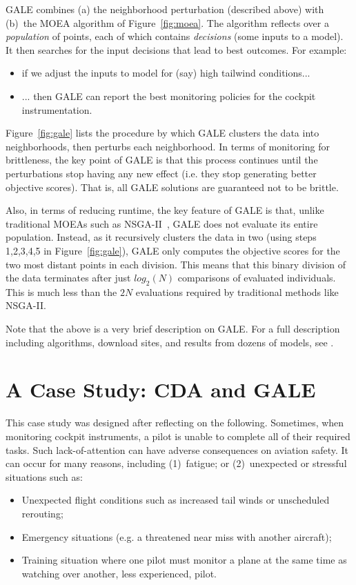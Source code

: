 \documentclass[journal]{IEEEtran}
\newcommand{\bi}{\begin{itemize}}
\newcommand{\ei}{\end{itemize}}
\newcommand{\fig}[1]{Figure~\ref{fig:#1}}
\begin{document}
GALE combines (a) the neighborhood perturbation (described above) with (b)~the MOEA algorithm of \fig{moea}.
The algorithm reflects over a {\em population} of points, each of which contains {\em decisions} (some inputs to a  model).
It then searches for the input decisions that lead to best outcomes.
For example:
\begin{itemize}
\item
if we adjust the inputs to model for (say) high tailwind conditions...
\item
... then GALE can report the best monitoring policies for the cockpit instrumentation.
\end{itemize}

\fig{gale} lists the procedure by which GALE clusters the data into neighborhoods, then perturbs each neighborhood.
In terms of monitoring for brittleness, the key point of GALE is that  this process continues until the perturbations stop having any new effect (i.e. they stop generating better objective scores). 
That is, all GALE solutions are guaranteed not to be brittle.


Also, in terms of reducing runtime, the key feature of GALE is that, unlike traditional MOEAs such as NSGA-II~\cite{deb00afast}, GALE does not evaluate its entire population.
Instead, as it recursively clusters the data in two (using steps 1,2,3,4,5 in \fig{gale}), 
GALE only computes the objective scores for the two most distant points in each division.  
This means that this binary division of the data terminates after just $log_2(N)$ comparisons of evaluated individuals. 
This is much less than the $2N$ evaluations required by  traditional methods like NSGA-II.

Note that the above is a very brief description on GALE. For a full description including algorithms, download sites, and results
from dozens of models, see \cite{galepaper,krallphd}.

\section{A Case Study:  CDA and GALE}\label{sec:case}

This case study was designed after reflecting on the following.
Sometimes, when monitoring cockpit instruments, a pilot is unable to complete all of their required tasks.
Such lack-of-attention can have adverse consequences on aviation safety.
It can occur for many reasons, including (1)~fatigue; or
(2)~unexpected or stressful situations such as:
\bi
\item 
Unexpected flight conditions such as increased tail winds or unscheduled rerouting;
\item
Emergency situations (e.g. a threatened near miss with another
aircraft);
\item
Training situation where one  pilot must monitor a plane at the same
time as watching over another, less experienced, pilot.
\ei
\end{document}
